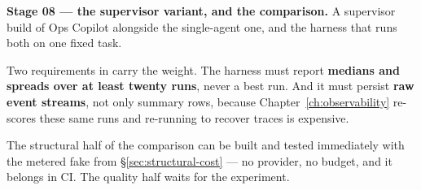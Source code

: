 \begin{projectbox}
\textbf{Stage 08 --- the supervisor variant, and the comparison.} A supervisor
build of Ops Copilot alongside the single-agent one, and the harness that runs
both on one fixed task.

Two requirements in  carry the weight. The
harness must report \textbf{medians and spreads over at least twenty runs}, never
a best run. And it must persist \textbf{raw event streams}, not only summary
rows, because Chapter~\ref{ch:observability} re-scores these same runs and
re-running to recover traces is expensive.

The structural half of the comparison can be built and tested immediately with
the metered fake from \S\ref{sec:structural-cost} --- no provider, no budget, and
it belongs in CI. The quality half waits for the experiment.
\end{projectbox}
